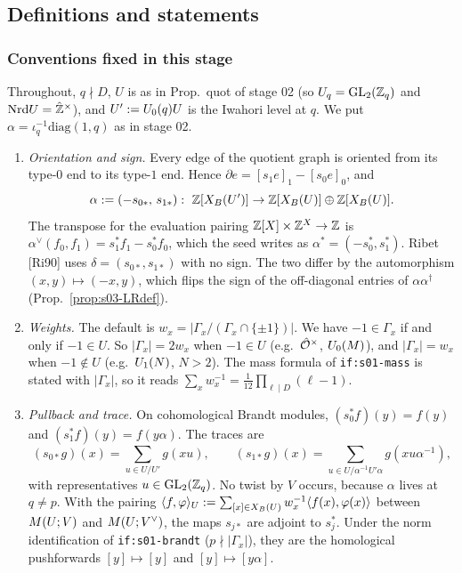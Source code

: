 \subsection{Definitions and statements}

\subsubsection{Conventions fixed in this stage}\label{ss:s03-conv}
Throughout, $q\nmid D$, $U$ is as in Prop.~quot of stage 02 (so $U_q=\mathrm{GL}_2(\mathbb{Z}_q)$ and $\mathrm{Nrd} U=\hat{\mathbb{Z}}^\times$), and
$U':=U_0(q)U$ is the Iwahori level at $q$. We put $\alpha=\iota_q^{-1}\mathrm{diag}(1,q)$ as in stage 02.
\begin{enumerate}[label=(C\arabic*)]
\item \emph{Orientation and sign.} Every edge of the quotient graph is oriented from its type-$0$ end to its type-$1$ end. Hence
  $\partial e=[s_1e]_1-[s_0e]_0$, and
  \[\alpha:=(-s_{0*},\,s_{1*}):\ \Z[\XB{U'}]\to\Z[\XB U]\oplus\Z[\XB U].\]
  The transpose for the evaluation pairing $\mathbb{Z}[X]\times\mathbb{Z}^X\to\mathbb{Z}$ is $\alpha^\vee(f_0,f_1)=s_1^*f_1-s_0^*f_0$, which the seed
  writes as $\alpha^*=(-s_0^*,s_1^*)$. Ribet [Ri90] uses $\delta=(s_{0*},s_{1*})$ with no sign. The two differ by the automorphism
  $(x,y)\mapsto(-x,y)$, which flips the sign of the off-diagonal entries of $\alpha\alpha^\dagger$
  (Prop.~\ref{prop:s03-LRdef}).
\item \emph{Weights.} The default is $w_x=|\Gamma_x/(\Gamma_x\cap\{\pm1\})|$. We have $-1\in\Gamma_x$ if and only if $-1\in U$. So $|\Gamma_x|=2w_x$ when $-1\in U$ (e.g.\ $\hat{\mathcal{O}}^\times$,
  $U_0(M)$), and $|\Gamma_x|=w_x$ when $-1\notin U$ (e.g.\ $U_1(N)$, $N>2$). The
  mass formula of \texttt{if:s01-mass} is stated with $|\Gamma_x|$, so it reads $\sum_x w_x^{-1}=\frac1{12}\prod_{\ell\mid D}(\ell-1)$.
\item \emph{Pullback and trace.} On cohomological Brandt modules, $(s_0^*f)(y)=f(y)$ and $(s_1^*f)(y)=f(y\alpha)$. The traces are
  \[(s_{0*}g)(x)=\sum_{u\in U/U'}g(xu),\qquad (s_{1*}g)(x)=\sum_{u\in U/\alpha^{-1}U'\alpha}g(xu\alpha^{-1}),\]
  with representatives $u\in\mathrm{GL}_2(\mathbb{Z}_q)$. No twist by $V$ occurs, because $\alpha$ lives at $q\ne p$. With the pairing
  $\langle f,\varphi\rangle_U:=\sum_{[x]\in X_B(U)}w_x^{-1}\langle f(x),\varphi(x)\rangle$ between $M(U;V)$ and $M(U;V^\vee)$, the
  maps $s_{j*}$ are adjoint to $s_j^*$. Under the norm identification of \texttt{if:s01-brandt} ($p\nmid|\Gamma_x|$), they are the
  homological pushforwards $[y]\mapsto[y]$ and $[y]\mapsto[y\alpha]$.

\end{enumerate}
